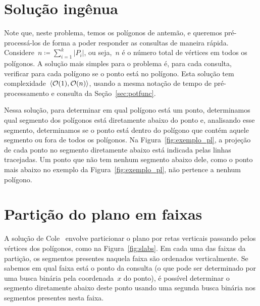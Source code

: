 \documentclass[main.tex]{subfiles}
\begin{document}
\section{Solução ingênua}

Note que, neste problema, temos os polígonos de antemão, e queremos pré-processá-los de forma a poder responder as consultas de maneira rápida. Considere~${n \coloneqq \sum\limits_{i = 1}^k{|P_i|}}$, ou seja,~$n$ é o número total de vértices em todos os polígonos. A solução mais simples para o problema é, para cada consulta, verificar para cada polígono se o ponto está no polígono. Esta solução tem complexidade~$\langle\mathcal{O}(1), \mathcal{O}(n)\rangle$, usando a mesma notação de tempo de pré-processamento e consulta da Seção~\ref{sec:potfunc}.

Nessa solução, para determinar em qual polígono está um ponto, determinamos qual segmento dos polígonos está diretamente abaixo do ponto e, analisando esse segmento, determinamos se o ponto está dentro do polígono que contém aquele segmento ou fora de todos os polígonos. Na Figura~\ref{fig:exemplo_pl}, a projeção de cada ponto no segmento diretamente abaixo está indicada pelas linhas tracejadas. Um ponto que não tem nenhum segmento abaixo dele, como o ponto mais abaixo no exemplo da Figura~\ref{fig:exemplo_pl}, não pertence a nenhum polígono.

\section{Partição do plano em faixas}

A solução de Cole~\cite{Cole86} envolve particionar o plano por retas verticais passando pelos vértices dos polígonos, como na Figura~\ref{fig:slabs}. Em cada uma das faixas da partição, os segmentos presentes naquela faixa são ordenados verticalmente. Se sabemos em qual faixa está o ponto da consulta (o que pode ser determinado por uma busca binária pela coordenada~$x$ do ponto), é possível determinar o segmento diretamente abaixo deste ponto usando uma segunda busca binária nos segmentos presentes nesta faixa.
\end{document}
